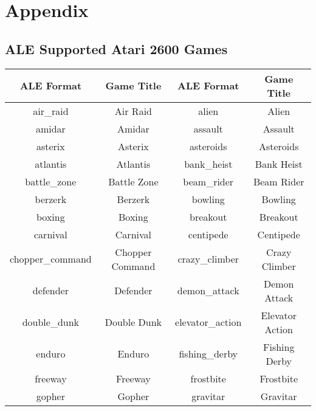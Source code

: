 \chapter{Appendix}
\section{ALE Supported Atari 2600 Games} \label{app:ALE_Games}
\begin{center}
    \begin{longtable}{ |c||c|c||c| }
        \hline
        ALE Format       & Game Title      & ALE Format         & Game Title        \\ [0.5ex]
        \hline
        \hline
        air\_raid        & Air Raid        & alien              & Alien             \\
        \hline
        amidar           & Amidar          & assault            & Assault           \\
        \hline
        asterix          & Asterix         & asteroids          & Asteroids         \\
        \hline
        atlantis         & Atlantis        & bank\_heist        & Bank Heist        \\
        \hline
        battle\_zone     & Battle Zone     & beam\_rider        & Beam Rider        \\
        \hline
        berzerk          & Berzerk         & bowling            & Bowling           \\
        \hline
        boxing           & Boxing          & breakout           & Breakout          \\
        \hline
        carnival         & Carnival        & centipede          & Centipede         \\
        \hline
        chopper\_command & Chopper Command & crazy\_climber     & Crazy Climber     \\
        \hline
        defender         & Defender        & demon\_attack      & Demon Attack      \\
        \hline
        double\_dunk     & Double Dunk     & elevator\_action   & Elevator Action   \\
        \hline
        enduro           & Enduro          & fishing\_derby     & Fishing Derby     \\
        \hline
        freeway          & Freeway         & frostbite          & Frostbite         \\
        \hline
        gopher           & Gopher          & gravitar           & Gravitar          \\

\end{longtable}
\end{center}
